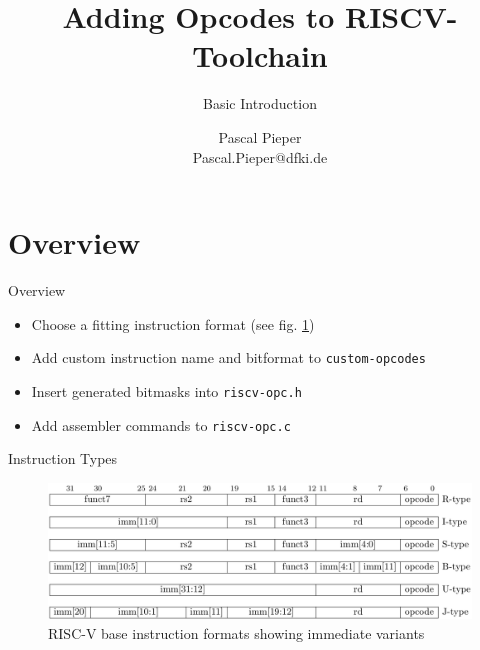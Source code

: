 \documentclass[aspectratio=169]{CPS-Beamer}
\title{Adding Opcodes to RISCV-Toolchain}
\subtitle{Basic Introduction}
\author[Pieper]{Pascal Pieper \\
{\tiny Pascal.Pieper@dfki.de}}
\institute[DFKI CPS]{DFKI GmbH, Cyber-Physical Systems \\ www.dfki.de/cps}
\begin{document}
\maketitle

\section{Overview}

\begin{frame}{Overview}
	\begin{block}{}
		\begin{itemize}
			\item Choose a fitting instruction format (see fig. \ref{formats})
			\item Add custom instruction name and bitformat to \texttt{custom-opcodes} 
			\item Insert generated bitmasks into \texttt{riscv-opc.h} 
			\item Add assembler commands to \texttt{riscv-opc.c} 
		\end{itemize}
	\end{block}
\end{frame}

\begin{frame}{Instruction Types}%
	\vspace{1em}
	\begin{figure}
		\includegraphics[width=\textwidth]{RiscV_Types.png}
		\caption{\label{formats}RISC-V base instruction formats showing immediate variants}
	\end{figure}
\end{frame}
\end{document}

